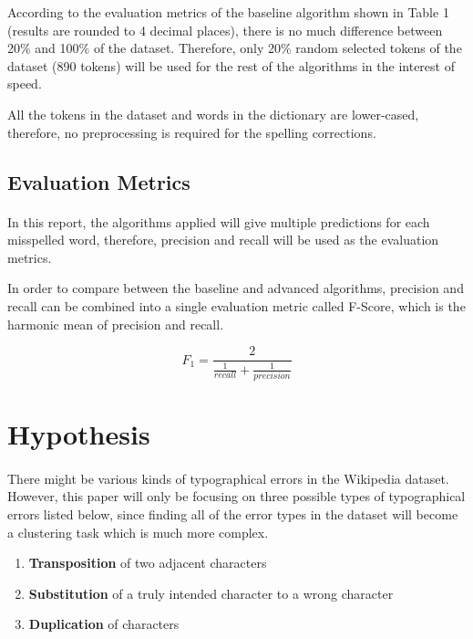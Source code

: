 \documentclass[11pt]{article}
\begin{document}
According to the evaluation metrics of the baseline algorithm shown in Table 1 (results are rounded to 4 decimal places), there is no much difference between 20\% and 100\% of the dataset. Therefore, only 20\% random selected tokens of the dataset (890 tokens) will be used for the rest of the algorithms in the interest of speed.

All the tokens in the dataset and words in the dictionary are lower-cased, therefore, no preprocessing is required for the spelling corrections.

\subsection{Evaluation Metrics}

\paragraph{} In this report, the algorithms applied will give multiple predictions for each misspelled word, therefore, precision and recall will be used as the evaluation metrics.

In order to compare between the baseline and advanced algorithms, precision and recall can be combined into a single evaluation metric called F-Score, which is the harmonic mean of precision and recall.\cite{InfromationRetrieval}

$$ 
F_1  = \frac{2}{\frac{1}{recall} + \frac{1}{precision}}
$$

\section{Hypothesis}

\paragraph{} There might be various kinds of typographical errors in the Wikipedia dataset. However, this paper will only be focusing on three possible types of typographical errors listed below, since finding all of the error types in the dataset will become a clustering task which is much more complex.

\begin{enumerate}
\item
\textbf{Transposition} of two adjacent characters

\item
\textbf{Substitution} of a truly intended character to a wrong character

\item
\textbf{Duplication} of characters
\end{enumerate}
\end{document}
